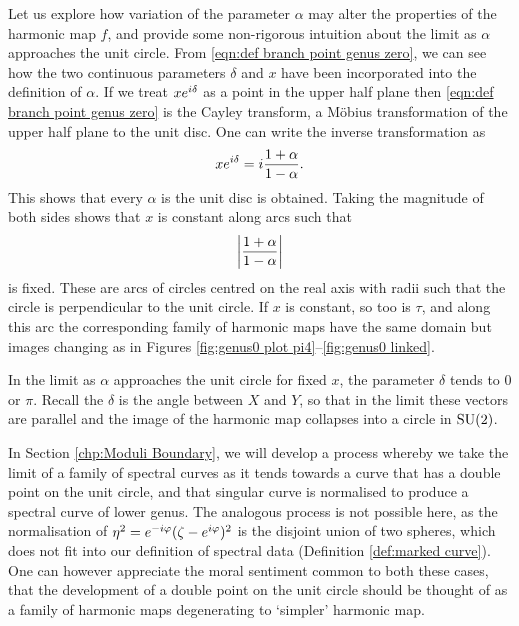 \documentclass{article}
\begin{document}
Let us explore how variation of the parameter $\alpha$ may alter the properties of the harmonic map $f$, and provide some non-rigorous intuition about the limit as $\alpha$ approaches the unit circle. From \eqref{eqn:def branch point genus zero}, we can see how the two continuous parameters $\delta$ and $x$ have been incorporated into the definition of $\alpha$. If we treat $xe^{i \delta}$ as a point in the upper half plane then \eqref{eqn:def branch point genus zero} is the Cayley transform, a M\"obius transformation of the upper half plane to the unit disc. One can write the inverse transformation as
\[
x e^{i \delta} = i \frac{1+\alpha}{1-\alpha}.
\]
This shows that every $\alpha$ is the unit disc is obtained. Taking the magnitude of both sides shows that $x$ is constant along arcs such that
\[
\left|\frac{1+\alpha}{1-\alpha}\right|
\]
is fixed. 
These are arcs of circles centred on the real axis with radii such that the circle is perpendicular to the unit circle. 
If $x$ is constant, so too is $\tau$, and along this arc the corresponding family of harmonic maps have the same domain but images changing as in Figures \ref{fig:genus0 plot pi4}--\ref{fig:genus0 linked}.

In the limit as $\alpha$ approaches the unit circle for fixed $x$, the parameter $\delta$ tends to $0$ or $\pi$. Recall the $\delta$ is the angle between $X$ and $Y$, so that in the limit these vectors are parallel and the image of the harmonic map collapses into a circle in $\mathrm{SU}(2)$.

In Section \ref{chp:Moduli Boundary}, we will develop a process whereby we take the limit of a family of spectral curves as it tends towards a curve that has a double point on the unit circle, and that singular curve is normalised to produce a spectral curve of lower genus. The analogous process is not possible here, as the normalisation of $\eta^2 = e^{-i \varphi} (\zeta- e^{i \varphi})^2$ is the disjoint union of two spheres, which does not fit into our definition of spectral data (Definition \ref{def:marked curve}). One can however appreciate the moral sentiment common to both these cases, that the development of a double point on the unit circle should be thought of as a family of harmonic maps degenerating to `simpler' harmonic map.

\end{document}
